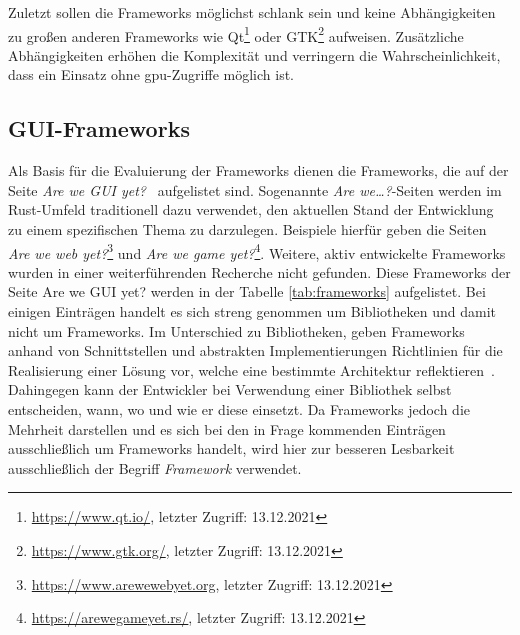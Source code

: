 Zuletzt sollen die Frameworks möglichst schlank sein und keine Abhängigkeiten zu großen anderen Frameworks wie Qt\footnote{\url{https://www.qt.io/}, letzter Zugriff: 13.12.2021} oder GTK\footnote{\url{https://www.gtk.org/}, letzter Zugriff: 13.12.2021} aufweisen. Zusätzliche Abhängigkeiten erhöhen die Komplexität und verringern die Wahrscheinlichkeit, dass ein Einsatz ohne \gls{gpu}-Zugriffe möglich ist.


\subsection{GUI-Frameworks}

Als Basis für die Evaluierung der Frameworks dienen die Frameworks, die auf der Seite \emph{Are we GUI yet?}~\cite{AreWeGUI} aufgelistet sind. Sogenannte \emph{Are we\dots?}-Seiten werden im Rust-Umfeld traditionell dazu verwendet, den aktuellen Stand der Entwicklung zu einem spezifischen Thema zu darzulegen. Beispiele hierfür geben die Seiten \emph{Are we web yet?}\footnote{\url{https://www.arewewebyet.org}, letzter Zugriff: 13.12.2021} und \emph{Are we game yet?}\footnote{\url{https://arewegameyet.rs/}, letzter Zugriff: 13.12.2021}. Weitere, aktiv entwickelte Frameworks wurden in einer weiterführenden Recherche nicht gefunden. Diese Frameworks der Seite Are we GUI yet? werden in der Tabelle \ref{tab:frameworks} aufgelistet. Bei einigen Einträgen handelt es sich streng genommen um Bibliotheken und damit nicht um Frameworks. Im Unterschied zu Bibliotheken, geben Frameworks anhand von Schnittstellen und abstrakten Implementierungen Richtlinien für die Realisierung einer Lösung vor, welche eine bestimmte Architektur reflektieren~\cite[S.~412]{vogelArchitekturVorgehenWIE2009}. Dahingegen kann der Entwickler bei Verwendung einer Bibliothek selbst entscheiden, wann, wo und wie er diese einsetzt. Da Frameworks jedoch die Mehrheit darstellen und es sich bei den in Frage kommenden Einträgen ausschließlich um Frameworks handelt, wird hier zur besseren Lesbarkeit ausschließlich der Begriff \emph{Framework} verwendet.


